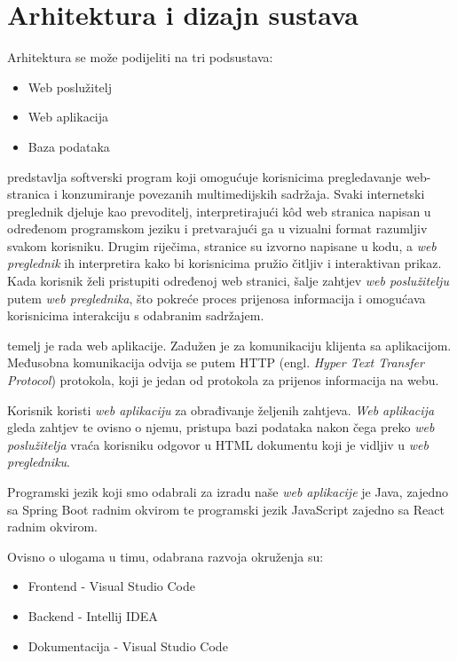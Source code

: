 \chapter{Arhitektura i dizajn sustava}

		Arhitektura se može podijeliti na tri podsustava:
		\begin{itemize}
			\item 	Web poslužitelj
			\item 	Web aplikacija
			\item 	Baza podataka		
		\end{itemize}

		 predstavlja softverski program koji omogućuje korisnicima 
		pregledavanje web-stranica i konzumiranje povezanih multimedijskih sadržaja. 
		Svaki internetski preglednik djeluje kao prevoditelj, interpretirajući kôd web 
		stranica napisan u određenom programskom jeziku i pretvarajući ga u vizualni 
		format razumljiv svakom korisniku. Drugim riječima, stranice su izvorno napisane 
		u kodu, a \textit{web preglednik} ih interpretira kako bi korisnicima pružio čitljiv i 
		interaktivan prikaz. Kada korisnik želi pristupiti određenoj web stranici, 
		šalje zahtjev \textit{web poslužitelju} putem \textit{web preglednika}, što pokreće proces 
		prijenosa informacija i omogućava korisnicima interakciju s odabranim sadržajem.


		 temelj je rada web aplikacije. Zadužen je za komunikaciju
		klijenta sa aplikacijom. Međusobna komunikacija odvija se putem HTTP (engl. \textit{Hyper
		Text Transfer Protocol}) protokola, koji je jedan od protokola za prijenos informacija
		na webu.

		Korisnik koristi \textit{web aplikaciju} za obrađivanje željenih zahtjeva.
		\textit{Web aplikacija} gleda zahtjev te ovisno o njemu, pristupa bazi podataka nakon čega
		preko \textit{web poslužitelja} vraća korisniku odgovor u HTML dokumentu koji je 
		vidljiv u \textit{web pregledniku}.

		Programski jezik koji smo odabrali za izradu naše \textit{web aplikacije} je Java, zajedno
		sa Spring Boot radnim okvirom te programski jezik JavaScript zajedno sa React radnim okvirom.

		Ovisno o ulogama u timu, odabrana razvoja okruženja su:

		\begin{itemize}
			\item Frontend - Visual Studio Code
			\item Backend - Intellij IDEA
			\item Dokumentacija - Visual Studio Code		
		\end{itemize}

